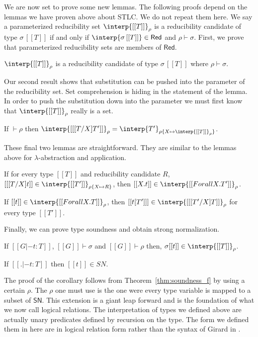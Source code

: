 We are now set to prove some new lemmas.  The following proofs depend
on the lemmas we have proven above about STLC.  We do not repeat them
here.  We say a parameterized reducibility set $\interp{[[T]]}_\rho$
is a reducibility candidate of type $\sigma\,[[T]]$ if and only if
$\interp{\sigma\,[[T]]} \in \mathsf{Red}$ and $\rho \vdash \sigma$.
First, we prove that parameterized reducibility sets are
members of $\mathsf{Red}$.
\vspace{-20px}
\begin{lemma}
  \label{lemma:sn_f_cand}
  $\interp{[[T]]}_\rho$ is a reducibility candidate of type $\sigma\,[[T]]$ 
  where $\rho \vdash \sigma$.
\end{lemma}
\noindent
Our second result shows that substitution can be pushed into the
parameter of the reducibility set.  Set comprehension is hiding in
the statement of the lemma.  In order to push the substitution down into
the parameter we must first know that $\interp{[[T]]}_\rho$ really is
a set.
\begin{lemma}
  \label{lemma:red_subst}
  If $\vdash \rho$ then $\interp{[[ [T/X]T']]}_\rho = \interp{T'}_{\rho\{ X \mapsto \interp{[[T]]}_\rho\}}$.
\end{lemma}
\noindent
These final two lemmas are straightforward.  They are similar to the
lemmas above for $\lambda$-abstraction and application.
\begin{lemma}
  \label{lemma:red_f_univ_abs}
  If for every type $[[T]]$ and reducibility candidate $R$, $[[ [T/X]t]] \in \interp{[[T']]}_{\rho\{X \mapsto R\}}$, then
  $[[\\ X.t]] \in \interp{[[Forall X.T']]}_\rho$.
\end{lemma}

\begin{lemma}
  \label{lemma:red_f_univ_app}
  If $[[t]] \in \interp{[[Forall X.T]]}_\rho$, then $[[t [T'] ]] \in \interp{[[ [T'/X]T]]}_\rho$ for every type $[[T']]$.
\end{lemma}
\noindent
Finally, we can prove type soundness and obtain strong normalization.
\begin{thm}
  \label{thm:soundness_f}
  If $[[G |- t : T]]$, $[[G]] \vdash \sigma$ and $[[G]] \vdash \rho$ then,
  $\sigma [[t]] \in \interp{[[T]]}_{\rho}$.
\end{thm}

\begin{corollary}
  \label{corollary:sn_f}
  If $[[. |- t : T]]$ then $[[t]] \in SN$.
\end{corollary}
\noindent
The proof of the corollary follows from Theorem~\ref{thm:soundness_f}
by using a certain $\rho$.  The $\rho$ one must use is the one were
every type variable is mapped to a subset of $\mathsf{SN}$.  This
extension is a giant leap forward and is the foundation of what we now
call logical relations.  The interpretation of types we defined above
are actually unary predicates defined by recursion on the type.  The
form we defined them in here are in logical relation form rather than
the syntax of Girard in \cite{Girard:1989}.
